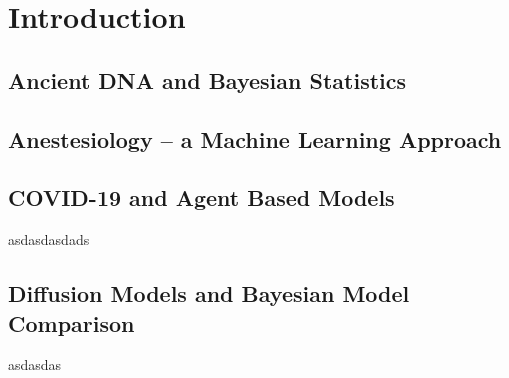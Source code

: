 
\chapter{Introduction}



\section{Ancient DNA and Bayesian Statistics}
\label{section:ancientDNA}



\section{Anestesiology -- a Machine Learning Approach }
\label{section:machine-learning}



\section{COVID-19 and Agent Based Models}
\label{section:agent-based-models}
asdasdasdads

\section{Diffusion Models and Bayesian Model Comparison}
\label{section:diffusion}
asdasdas
